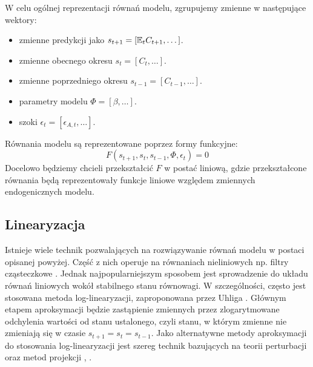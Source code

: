 W celu ogólnej reprezentacji równań modelu, zgrupujemy zmienne w następujące wektory:
\begin{itemize}
    \item zmienne predykcji jako $s_{t+1} = [\mathbb{E}_t C_{t+1}, \dots]$.
    \item zmienne obecnego okresu $s_t = [C_{t}, \dots]$.
    \item zmienne poprzedniego okresu $s_{t-1} = [C_{t-1}, \dots]$.
    \item parametry modelu $\Phi = [\beta, \dots]$.
    \item szoki $\epsilon_t = [\epsilon_{A, t}, \dots]$.
\end{itemize}
Równania modelu są reprezentowane poprzez formy funkcyjne:
\begin{equation}
    \label{eqn:dsgeEqnGen}
    F(s_{t+1}, s_t, s_{t-1}, \Phi, \epsilon_t) = 0
\end{equation}
Docelowo będziemy chcieli przekształcić $F$ w postać liniową, gdzie przekształcone równania będą reprezentowały funkcje liniowe względem zmiennych endogenicznych modelu.

\subsection{Linearyzacja}
\label{sec:linearize_model}


Istnieje wiele technik pozwalających na rozwiązywanie równań modelu w postaci opisanej powyżej. Część z nich operuje na równaniach nieliniowych np. filtry cząsteczkowe \cite{herbst}. Jednak najpopularniejszym sposobem jest sprowadzenie do układu równań liniowych wokół stabilnego stanu równowagi. W szczególności, często jest stosowana metoda log-linearyzacji, zaproponowana przez Uhliga \cite{uhlig:1995}. Głównym etapem aproksymacji będzie zastąpienie zmiennych przez zlogarytmowane odchylenia wartości od stanu ustalonego, czyli stanu, w którym zmienne nie zmieniają się w czasie $s_{t+1} = s_{t} = s_{t-1}$. Jako alternatywne metody aproksymacji do stosowania log-linearyzacji jest szereg technik bazujących na teorii perturbacji oraz metod projekcji \cite{rubioRamirez}, \cite{FERNANDEZVILLAVERDE2016527}.

